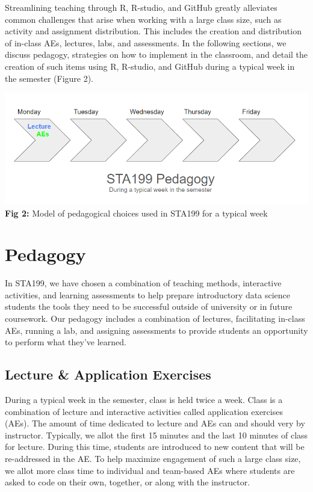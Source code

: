 \documentclass[
  12pt]{article}
\begin{document}
Streamlining teaching through R, R-studio, and GitHub greatly alleviates
common challenges that arise when working with a large class size, such
as activity and assignment distribution. This includes the creation and
distribution of in-class AEs, lectures, labs, and assessments. In the
following sections, we discuss pedagogy, strategies on how to implement
in the classroom, and detail the creation of such items using R,
R-studio, and GitHub during a typical week in the semester (Figure 2).

\includegraphics{images/pedagogy.png} \textbf{Fig 2:} Model of
pedagogical choices used in STA199 for a typical week

\hypertarget{sec-ped}{%
\section{Pedagogy}\label{sec-ped}}

In STA199, we have chosen a combination of teaching methods, interactive
activities, and learning assessments to help prepare introductory data
science students the tools they need to be successful outside of
university or in future coursework. Our pedagogy includes a combination
of lectures, facilitating in-class AEs, running a lab, and assigning
assessments to provide students an opportunity to perform what they've
learned.

\hypertarget{lecture-application-exercises}{%
\subsection{Lecture \& Application
Exercises}\label{lecture-application-exercises}}

During a typical week in the semester, class is held twice a week. Class
is a combination of lecture and interactive activities called
application exercises (AEs). The amount of time dedicated to lecture and
AEs can and should very by instructor. Typically, we allot the first 15
minutes and the last 10 minutes of class for lecture. During this time,
students are introduced to new content that will be re-addressed in the
AE. To help maximize engagement of such a large class size, we allot
more class time to individual and team-based AEs where students are
asked to code on their own, together, or along with the instructor.
\end{document}
